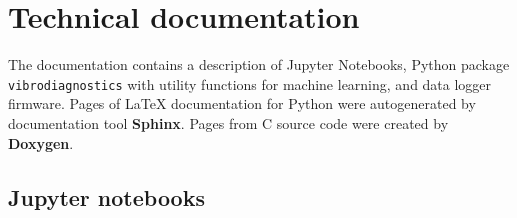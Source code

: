 \thispagestyle{empty}
\chapter{Technical documentation} \label{appendix:technical-docs}
\renewcommand*{\thepage}{A-\arabic{page}}
The documentation contains a description of Jupyter Notebooks, Python package \verb|vibrodiagnostics| with utility functions for machine learning, and data logger firmware. Pages of \LaTeX \; documentation for Python were autogenerated by documentation tool \textbf{Sphinx}. Pages from C source code were created by \textbf{Doxygen}. 

\section{Jupyter notebooks}
